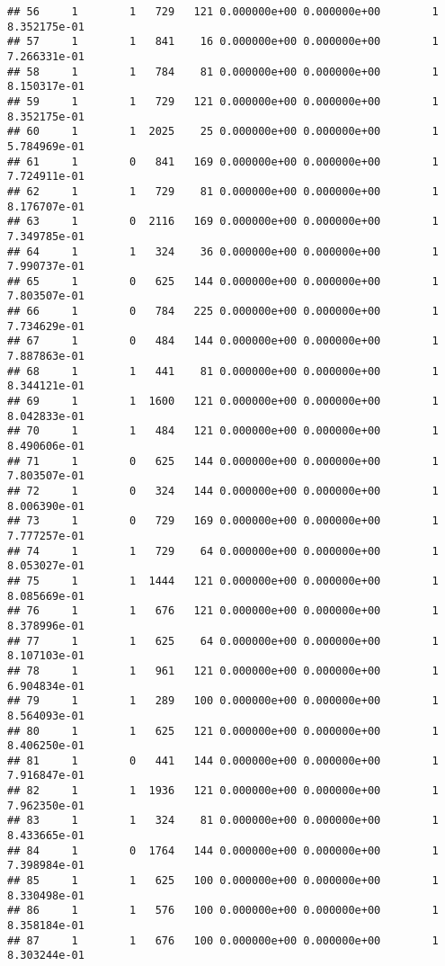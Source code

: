 \documentclass[
]{article}
\begin{document}
\begin{enumerate}
\begin{verbatim}
## 56     1        1   729   121 0.000000e+00 0.000000e+00        1  8.352175e-01
## 57     1        1   841    16 0.000000e+00 0.000000e+00        1  7.266331e-01
## 58     1        1   784    81 0.000000e+00 0.000000e+00        1  8.150317e-01
## 59     1        1   729   121 0.000000e+00 0.000000e+00        1  8.352175e-01
## 60     1        1  2025    25 0.000000e+00 0.000000e+00        1  5.784969e-01
## 61     1        0   841   169 0.000000e+00 0.000000e+00        1  7.724911e-01
## 62     1        1   729    81 0.000000e+00 0.000000e+00        1  8.176707e-01
## 63     1        0  2116   169 0.000000e+00 0.000000e+00        1  7.349785e-01
## 64     1        1   324    36 0.000000e+00 0.000000e+00        1  7.990737e-01
## 65     1        0   625   144 0.000000e+00 0.000000e+00        1  7.803507e-01
## 66     1        0   784   225 0.000000e+00 0.000000e+00        1  7.734629e-01
## 67     1        0   484   144 0.000000e+00 0.000000e+00        1  7.887863e-01
## 68     1        1   441    81 0.000000e+00 0.000000e+00        1  8.344121e-01
## 69     1        1  1600   121 0.000000e+00 0.000000e+00        1  8.042833e-01
## 70     1        1   484   121 0.000000e+00 0.000000e+00        1  8.490606e-01
## 71     1        0   625   144 0.000000e+00 0.000000e+00        1  7.803507e-01
## 72     1        0   324   144 0.000000e+00 0.000000e+00        1  8.006390e-01
## 73     1        0   729   169 0.000000e+00 0.000000e+00        1  7.777257e-01
## 74     1        1   729    64 0.000000e+00 0.000000e+00        1  8.053027e-01
## 75     1        1  1444   121 0.000000e+00 0.000000e+00        1  8.085669e-01
## 76     1        1   676   121 0.000000e+00 0.000000e+00        1  8.378996e-01
## 77     1        1   625    64 0.000000e+00 0.000000e+00        1  8.107103e-01
## 78     1        1   961   121 0.000000e+00 0.000000e+00        1  6.904834e-01
## 79     1        1   289   100 0.000000e+00 0.000000e+00        1  8.564093e-01
## 80     1        1   625   121 0.000000e+00 0.000000e+00        1  8.406250e-01
## 81     1        0   441   144 0.000000e+00 0.000000e+00        1  7.916847e-01
## 82     1        1  1936   121 0.000000e+00 0.000000e+00        1  7.962350e-01
## 83     1        1   324    81 0.000000e+00 0.000000e+00        1  8.433665e-01
## 84     1        0  1764   144 0.000000e+00 0.000000e+00        1  7.398984e-01
## 85     1        1   625   100 0.000000e+00 0.000000e+00        1  8.330498e-01
## 86     1        1   576   100 0.000000e+00 0.000000e+00        1  8.358184e-01
## 87     1        1   676   100 0.000000e+00 0.000000e+00        1  8.303244e-01

\end{verbatim}
\end{enumerate}
\end{document}
